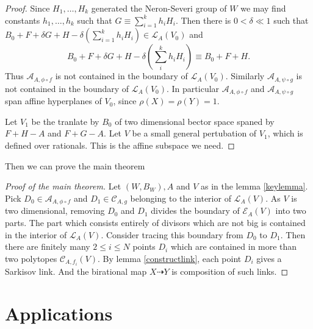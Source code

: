 \documentclass{article}
\begin{document}
\begin{proof}
Since $H_{1},\ldots ,H_{k}$ generated the Neron-Severi group of $W$ we may find constants $h_{1},\ldots ,h_{k}$ such that $G \equiv \sum^{k}_{i=1} h_{i}H_{i}$. Then there is $0< \delta\ll 1$ such that  $B_{0}+F+\delta G+H- \delta(\sum_{i=1}^{k} h_{i}H_{i}) \in \mathcal{L}_{A}(V_{0})$ and
\[
  B_{0}+F+\delta G+H-\delta (\sum_i^k h_{i}H_{i}) \equiv B_{0}+F+H
.\]
Thus $\mathcal{A}_{A,\phi\circ f}$ is not contained in the boundary of $\mathcal{L}_{A}(V_{0})$. Similarly $\mathcal{A}_{A,\psi\circ g}$ is not contained in the boundary of $\mathcal{L}_{A}(V_{0})$. In particular $\mathcal{A}_{A,\phi\circ f}$ and   $\mathcal{A}_{A,\psi\circ g}$ span affine hyperplanes of $V_{0}$, since $\rho(X)=\rho(Y)=1$.

Let $V_{1}$ be the tranlate by $B_{0}$ of two dimensional bector space spaned by $F+H-A$ and $F+G-A$. Let $V$ be a small general pertubation of $V_{1}$, which is defined over rationals. This is the affine subspace we need.
\end{proof}
Then we can prove the main theorem
\begin{proof}[Proof of the main theorem]
Let $(W,B_{W}),A $ and $V$ as in the lemma \ref{keylemma}.  Pick $ D_{0} \in \mathcal{A}_{A,\phi\circ f} $  and $ D_1\in \mathcal{C}_{A,g} $ belonging to the interior of $ \mathcal{L}_A(V) $. As $ V $ is two dimensional, removing $ D_0 $ and $ D_1 $ divides the boundary of $ \mathcal{E}_A(V) $ into two parts. The part which consists entirely of divisors which are not big is contained in the interior of $ \mathcal{L}_A(V) $. Consider tracing this boundary from $ D_0 $ to $ D_1 $. Then there are finitely many $ 2\leqslant i\leqslant N $ points $ D_i $ which are contained in more than two polytopes $ \mathcal{C}_{A,f_i}(V) $. By lemma \ref{constructlink},  each point $ D_i $ gives a Sarkisov link. And the birational map $X \dashrightarrow Y$ is composition of such links.
\end{proof}


\section{Applications}
\end{document}
